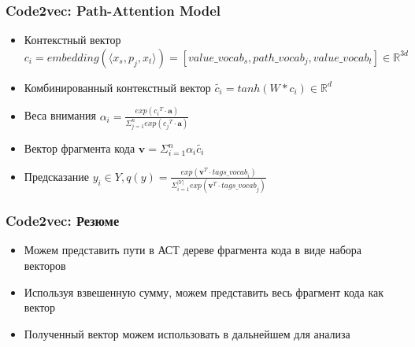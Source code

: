 \documentclass[xcolor=table,english]{beamer}
\begin{document}
\begin{frame}[fragile] \frametitle{Code2vec: Path-Attention Model}
    \begin{itemize}
        \item Контекстный вектор $c_i = embedding(\langle x_s, p_j, x_t \rangle) = [value\_vocab_s, path\_vocab_j, value\_vocab_t] \in \mathbb{R}^{3d}$
        \item Комбинированный контекстный вектор $\tilde{c_i} = tanh(W * c_i) \in \mathbb{R}^d$
        \item Веса внимания $\alpha_i = \frac{exp({c_i}^T \cdot \textbf{a})}{\Sigma_{j=1}^n exp({c_j}^T \cdot \textbf{a})}$
        \item Вектор фрагмента кода $\textbf{v} = \Sigma_{i=1}^n \alpha_i \tilde{c_i}$
        \item Предсказание $y_i \in Y, q(y) = \frac{exp(\textbf{v}^T \cdot \textit{tags\_vocab}_i)}{\Sigma_{i=1}^{|Y|} exp(\textbf{v}^T \cdot \textit{tags\_vocab}_j) }$
    \end{itemize}
\end{frame}

\begin{frame}[fragile] \frametitle{Code2vec: Резюме}
    \begin{itemize}
        \item Можем представить пути в АСТ дереве фрагмента кода в виде набора векторов
        \item Используя взвешенную сумму, можем представить весь фрагмент кода как вектор
        \item Полученный вектор можем использовать в дальнейшем для анализа
    \end{itemize}
\end{frame}
\end{document}
